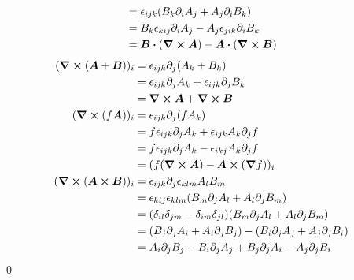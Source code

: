 \documentclass[uplatex,dvipdfmx,a4paper,11pt]{jlreq}
\makeatletter
\newcommand{\rot}{\curl}
\theoremstyle{definition}
\renewenvironment{proof}[1][\proofname]{\par
  \normalfont
  \topsep6\p@\@plus6\p@ \trivlist
  \item[\hskip\labelsep{\bfseries #1}\@addpunct{\bfseries}]\ignorespaces\quad\par
}{%
  \qed\endtrivlist\@endpefalse
}
\renewcommand\proofname{証明}
\makeatother
\begin{document}
\begin{proof}
\begin{align}
                               & = \epsilon_{ijk}(B_k\partial_iA_j + A_j\partial_iB_k)             \\
                               & = B_k\epsilon_{kij}\partial_iA_j - A_j\epsilon_{jik}\partial_iB_k \\
                               & = \bm{B}\vdot(\rot{\bm{A}}) - \bm{A}\vdot(\rot{\bm{B}})
  \end{align}
  \begin{align}
    (\rot{(\bm{A} + \bm{B})})_i    & = \epsilon_{ijk}\partial_j(A_k + B_k)                                                                   \\
                                   & = \epsilon_{ijk}\partial_jA_k + \epsilon_{ijk}\partial_jB_k                                             \\
                                   & = \rot{\bm{A}} + \rot{\bm{B}}                                                                           \\
    (\rot{(f\bm{A})})_i            & = \epsilon_{ijk}\partial_j(fA_k)                                                                        \\
                                   & = f\epsilon_{ijk}\partial_jA_k + \epsilon_{ijk}A_k\partial_jf                                           \\
                                   & = f\epsilon_{ijk}\partial_jA_k - \epsilon_{ikj}A_k\partial_jf                                           \\
                                   & = (f(\rot{\bm{A}}) - \bm{A}\cross(\grad{f}))_i                                                          \\
    (\rot{(\bm{A}\cross\bm{B})})_i & = \epsilon_{ijk}\partial_j\epsilon_{klm}A_lB_m                                                          \\
                                   & = \epsilon_{kij}\epsilon_{klm}(B_m\partial_jA_l + A_l\partial_jB_m)                                     \\
                                   & = (\delta_{il}\delta_{jm} - \delta_{im}\delta_{jl})(B_m\partial_jA_l + A_l\partial_jB_m)                \\
                                   & = (B_j\partial_jA_i + A_i\partial_jB_j) - (B_i\partial_jA_j + A_j\partial_jB_i)                         \\
                                   & = A_i\partial_jB_j - B_i\partial_jA_j + B_j\partial_jA_i - A_j\partial_jB_i                             \\

\end{align}
\end{proof}
\end{document}
